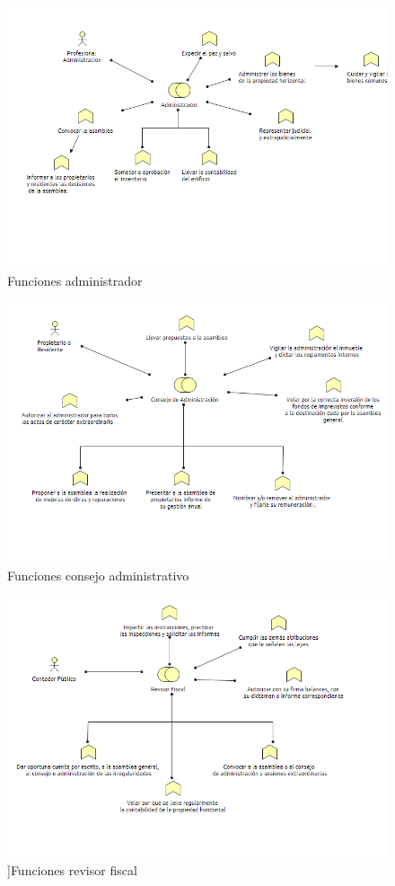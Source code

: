 \begin{figure}[th!]
	\centering
	\includegraphics[width=0.7\linewidth]{arquitectura/negocio/imgs/funciones-1}
	\caption{Funciones administrador}
\end{figure}
\begin{figure}[th!]
	\centering
	\includegraphics[width=0.7\linewidth]{arquitectura/negocio/imgs/funciones-2}
	\caption{Funciones consejo administrativo}
\end{figure}
\begin{figure}[th!]
	\centering
	\includegraphics[width=0.7\linewidth]{arquitectura/negocio/imgs/funciones-3}
	\caption{]Funciones revisor fiscal}
\end{figure}
\newpage

